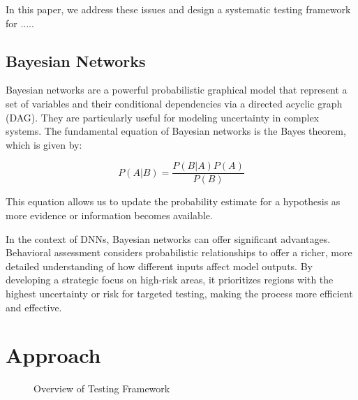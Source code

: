 \documentclass[10pt, conference, a4paper, final]{IEEEtran}
\begin{document}
In this paper, we address these issues and design a systematic testing framework for .....

\subsection{Bayesian Networks}


Bayesian networks are a powerful probabilistic graphical model that represent a set of variables and their conditional dependencies via a directed acyclic graph (DAG). They are particularly useful for modeling uncertainty in complex systems. The fundamental equation of Bayesian networks is the Bayes theorem, which is given by:

\begin{equation}
P(A|B) = \frac{P(B|A)P(A)}{P(B)}
\end{equation}

This equation allows us to update the probability estimate for a hypothesis as more evidence or information becomes available.

In the context of DNNs, Bayesian networks can offer significant advantages. Behavioral assessment considers probabilistic relationships to offer a richer, more detailed understanding of how different inputs affect model outputs. By developing a strategic focus on high-risk areas, it prioritizes regions with the highest uncertainty or risk for targeted testing, making the process more efficient and effective. 



\section{Approach}
\begin{figure}{}
    \centering

    \caption{Overview of Testing Framework}
    \label{fig:framework}
\end{figure}
\end{document}
